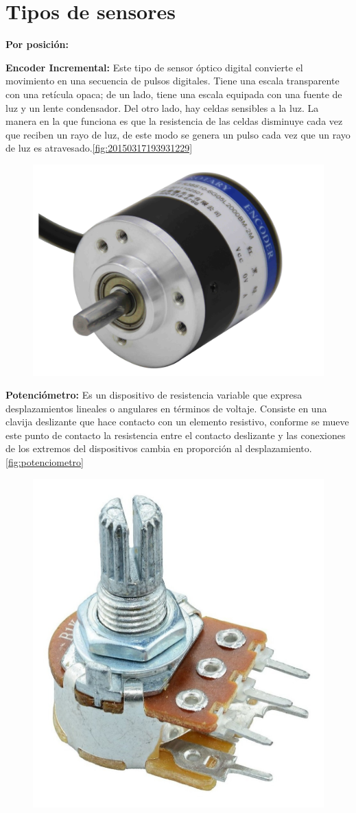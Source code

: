 \section{Tipos de sensores}
\textbf{Por posición:}

\textbf{Encoder Incremental:} Este tipo de sensor óptico digital convierte el movimiento en una secuencia de pulsos digitales. Tiene una escala transparente con una retícula opaca; de un lado, tiene una escala equipada con una fuente de luz y un lente condensador. Del otro lado, hay celdas sensibles a la luz. La manera en la que funciona es que la resistencia de las celdas disminuye cada vez que reciben un rayo de luz, de este modo se genera un pulso cada vez que un rayo de luz es atravesado.\autoref{fig:20150317193931229}



\begin{figure}[h]
	\centering
	\includegraphics[width=0.4\linewidth]{portada/20150317193931229}
	\caption{}
	\label{fig:20150317193931229}
\end{figure}



\textbf{Potenciómetro:} Es un dispositivo de resistencia variable que expresa desplazamientos lineales o angulares en términos de voltaje. Consiste en una clavija deslizante que hace contacto con un elemento resistivo, conforme se mueve este punto de contacto la resistencia entre el contacto deslizante y las conexiones de los extremos del dispositivos cambia en proporción al desplazamiento. \autoref{fig:potenciometro}\\

\begin{figure}[h]
	\centering
	\includegraphics[width=0.2\linewidth, height=0.2\textheight]{img/potenciometro}
	\caption[Potenciómetro]{}
	\label{fig:potenciometro}
\end{figure}




